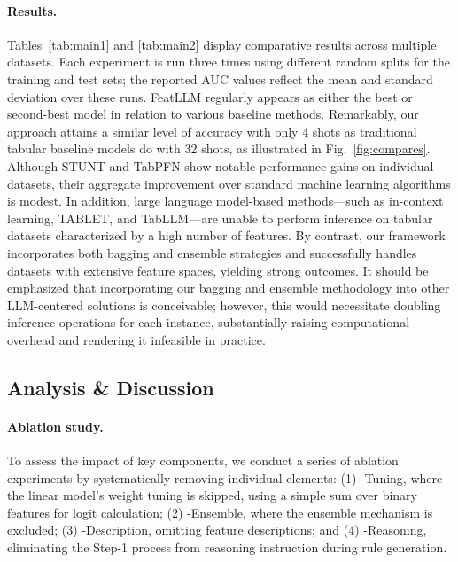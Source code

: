 \paragraph{Results.}
Tables~\ref{tab:main1} and \ref{tab:main2} display comparative results across multiple datasets. Each experiment is run three times using different random splits for the training and test sets; the reported AUC values reflect the mean and standard deviation over these runs. \textsf{FeatLLM} regularly appears as either the best or second-best model in relation to various baseline methods. Remarkably, our approach attains a similar level of accuracy with only 4 shots as traditional tabular baseline models do with 32 shots, as illustrated in Fig.~\ref{fig:compares}. Although STUNT and TabPFN show notable performance gains on individual datasets, their aggregate improvement over standard machine learning algorithms is modest. In addition, large language model-based methods—such as in-context learning, TABLET, and TabLLM—are unable to perform inference on tabular datasets characterized by a high number of features. By contrast, our framework incorporates both bagging and ensemble strategies and successfully handles datasets with extensive feature spaces, yielding strong outcomes. It should be emphasized that incorporating our bagging and ensemble methodology into other LLM-centered solutions is conceivable; however, this would necessitate doubling inference operations for each instance, substantially raising computational overhead and rendering it infeasible in practice.

\subsection{Analysis \& Discussion}
\label{sec:analysis}
\paragraph{Ablation study.} 
To assess the impact of key components, we conduct a series of ablation experiments by systematically removing individual elements: (1) \textsf{-Tuning}, where the linear model's weight tuning is skipped, using a simple sum over binary features for logit calculation; (2) \textsf{-Ensemble}, where the ensemble mechanism is excluded; (3) \textsf{-Description}, omitting feature descriptions; and (4) \textsf{-Reasoning}, eliminating the Step-1 process from reasoning instruction during rule generation.

